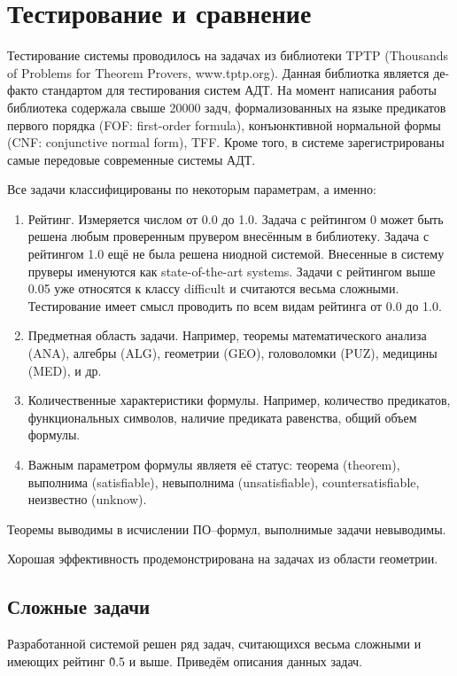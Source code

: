 \section{Тестирование и сравнение}

Тестирование системы проводилось на задачах из библиотеки TPTP (Thousands of Problems for Theorem Provers, www.tptp.org). Данная библиотка является де-факто стандартом для тестирования систем АДТ. На момент написания работы библиотека содержала свыше 20000 задч, формализованных на языке предикатов первого порядка (FOF: first-order formula), конъюнктивной нормальной формы (CNF: conjunctive normal form), TFF. Кроме того, в системе зарегистрированы самые передовые современные системы АДТ.

Все задачи классифицированы по некоторым параметрам, а именно:
\begin{enumerate}
\item Рейтинг. Измеряется числом от 0.0 до 1.0. Задача с рейтингом 0 может быть решена любым проверенным прувером внесённым в библиотеку. Задача с рейтингом 1.0 ещё не была решена ниодной системой. Внесенные в систему пруверы именуются как state-of-the-art systems. Задачи с рейтингом выше 0.05 уже относятся к классу difficult и считаются весьма сложными. Тестирование имеет смысл проводить по всем видам рейтинга от 0.0 до 1.0.
\item Предметная область задачи. Например, теоремы математического анализа (ANA), алгебры (ALG), геометрии (GEO), головоломки (PUZ), медицины (MED), и др.
\item Количественные характеристики формулы. Например, количество предикатов, функциональных символов, наличие предиката равенства, общий объем формулы.
\item Важным параметром формулы являетя её статус: теорема (theorem), выполнима (satisfiable), невыполнима (unsatisfiable), countersatisfiable, неизвестно (unknow).
\end{enumerate}

Теоремы выводимы в исчислении ПО--формул, выполнимые задачи невыводимы.

Хорошая эффективность продемонстрирована на задачах из области геометрии. 



\subsection{Сложные задачи}
Разработанной системой решен ряд задач, считающихся весьма сложными и имеющих рейтинг \~0.5 и выше. Приведём описания данных задач.

